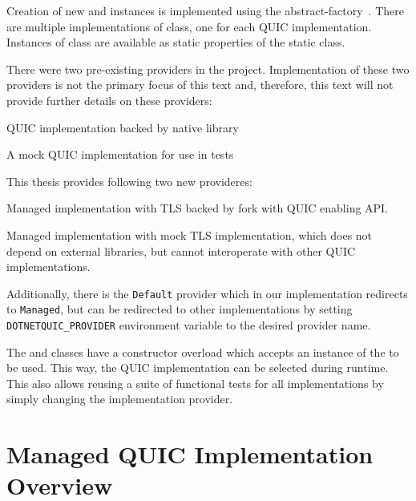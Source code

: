 Creation of new \QuicListener{} and \QuicConnection{} instances is implemented using the
\gls{abstract-factory}~\cite{wiki:abstract-factory-pattern}. There are multiple implementations of
\QuicImplementationProvider{} class, one for each QUIC implementation. Instances of
\QuicImplementationProvider{} class are available as static properties of the
 static class.

There were two pre-existing providers in the  project. Implementation of
these two providers is not the primary focus of this text and, therefore, this text will not provide
further details on these providers:

\begin{itemize}

   QUIC implementation backed by \libmsquic{} native library

   A mock QUIC implementation for use in tests

\end{itemize}

This thesis provides following two new provideres:

\begin{itemize}

   Managed implementation with TLS backed by \libopenssl{} fork with QUIC enabling API.

   Managed implementation with mock TLS implementation, which does not depend on external libraries, but cannot interoperate with other QUIC implementations.

\end{itemize}

Additionally, there is the \texttt{Default} provider which in our implementation redirects to
\texttt{Managed}, but can be redirected to other implementations by setting
\texttt{DOTNETQUIC_PROVIDER} environment variable to the desired provider name.

The \QuicListener{} and \QuicConnection{} classes have a constructor overload which accepts an
instance of the \QuicImplementationProvider{} to be used. This way, the QUIC implementation can be
selected during runtime. This also allows reusing a suite of functional tests for all
implementations by simply changing the implementation provider.

\section{Managed QUIC Implementation Overview}


